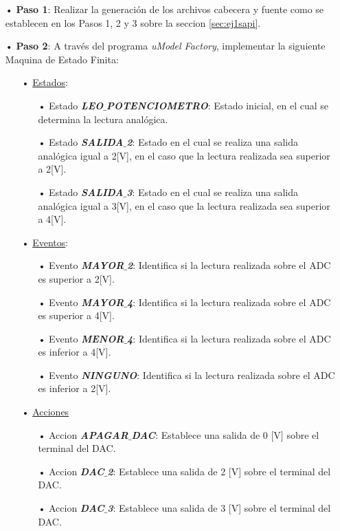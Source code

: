 \documentclass[12pt,letterpaper]{article}
\begin{document}
\begin{enumerate}
\item[•]\textbf{Paso 1}: Realizar la generación de los archivos cabecera y fuente como se establecen en los Pasos 1, 2 y 3 sobre la seccion \ref{sec:ej1sapi}.

\item[•]\textbf{Paso 2}: A través del programa \textit{uModel Factory}, implementar la siguiente Maquina de Estado Finita:

\begin{enumerate}
\item[•]\underline{Estados}:
\begin{enumerate}
\item[•]Estado \textit{\textbf{LEO$\_$POTENCIOMETRO}}: Estado inicial, en el cual se determina la lectura analógica.
\item[•]Estado \textit{\textbf{SALIDA$\_$2}}: Estado en el cual se realiza una salida analógica igual a 2[V], en el caso que la lectura realizada sea superior a 2[V].
\item[•]Estado \textit{\textbf{SALIDA$\_$3}}: Estado en el cual se realiza una salida analógica igual a 3[V], en el caso que la lectura realizada sea superior a 4[V].
\end{enumerate}
\item[•]\underline{Eventos}:
\begin{enumerate}
\item[•]Evento \textit{\textbf{MAYOR$\_$2}}: Identifica si la lectura realizada sobre el ADC es superior a 2[V].
\item[•]Evento \textit{\textbf{MAYOR$\_$4}}: Identifica si la lectura realizada sobre el ADC es superior a 4[V].
\item[•]Evento \textit{\textbf{MENOR$\_$4}}: Identifica si la lectura realizada sobre el ADC es inferior a 4[V].
\item[•]Evento \textit{\textbf{NINGUNO}}: Identifica si la lectura realizada sobre el ADC es inferior a 2[V].
\end{enumerate}
\item[•]\underline{Acciones}
\begin{enumerate}
\item[•]Accion \textit{\textbf{APAGAR$\_$DAC}}: Establece una salida de 0 [V] sobre el terminal del DAC.
\item[•]Accion \textit{\textbf{DAC$\_$2}}: Establece una salida de 2 [V] sobre el terminal del DAC.
\item[•]Accion \textit{\textbf{DAC$\_$3}}: Establece una salida de 3 [V] sobre el terminal del DAC.
\end{enumerate}
\end{enumerate}


\end{enumerate}
\end{document}
